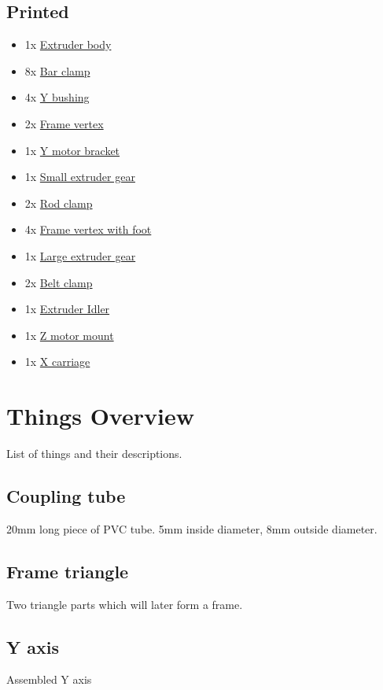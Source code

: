\documentclass[11pt]{article}
\begin{document}
\subsection{Printed}
\begin{itemize}
\item 1x \hyperlink{thing_extruder-body}{Extruder body}
\item 8x \hyperlink{thing_bar-clamp}{Bar clamp}
\item 4x \hyperlink{thing_y-bushing}{Y bushing}
\item 2x \hyperlink{thing_frame-vertex}{Frame vertex}
\item 1x \hyperlink{thing_y-motor-bracket}{Y motor bracket}
\item 1x \hyperlink{thing_small-gear}{Small extruder gear}
\item 2x \hyperlink{thing_rod-clamp}{Rod clamp}
\item 4x \hyperlink{thing_frame-vertex-foot}{Frame vertex with foot}
\item 1x \hyperlink{thing_large-gear}{Large extruder gear}
\item 2x \hyperlink{thing_belt-clamp}{Belt clamp}
\item 1x \hyperlink{thing_idler}{Extruder Idler}
\item 1x \hyperlink{thing_z-motor-mount}{Z motor mount}
\item 1x \hyperlink{thing_x-carriage}{X carriage}
\end{itemize}

\newpage

\section{Things Overview}
List of things and their descriptions.

\hypertarget{thing_coupling-tube}{\subsection{Coupling tube}}
20mm long piece of PVC tube. 5mm inside diameter, 8mm outside diameter.

\hypertarget{thing_frame-triangle}{\subsection{Frame triangle}}
Two triangle parts which will later form a frame.

\hypertarget{thing_y-axis}{\subsection{Y axis}}
Assembled Y axis
\end{document}
